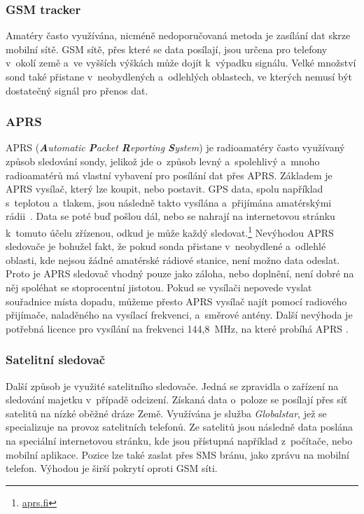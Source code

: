 \documentclass[twoside]{ctuthesis}
\theoremstyle{plain}
\theoremstyle{definition}
\theoremstyle{note}
\begin{document}
				\subsubsection{GSM tracker}
				Amatéry často využívána, nicméně nedoporučovaná metoda \cite{web_sledovani} je zasílání dat skrze mobilní sítě. GSM sítě, přes které se data posílají, jsou určena pro telefony v~okolí země a~ve vyšších výškách může dojít k~výpadku signálu. Velké množství sond také přistane v~neobydlených a~odlehlých oblastech, ve kterých nemusí být dostatečný signál pro přenos dat.


				\subsubsection{APRS}
				APRS (\textit{\textbf{A}utomatic \textbf{P}acket \textbf{R}eporting \textbf{S}ystem}) je radioamatéry často využívaný způsob sledování sondy, jelikož jde o~způsob levný a~spolehlivý a~mnoho radioamatérů má vlastní vybavení pro posílání dat přes APRS. Základem je APRS vysílač, který lze koupit, nebo postavit. GPS data, spolu například s~teplotou a~tlakem, jsou následně takto vysílána a~přijímána amatérskými rádii~\cite{web_sledovani}. Data se poté buď pošlou dál, nebo se nahrají na internetovou stránku k~tomuto účelu zřízenou, odkud je může každý sledovat.\footnote{\url{aprs.fi}}
				Nevýhodou APRS sledovače je bohužel fakt, že pokud sonda přistane v~neobydlené a~odlehlé oblasti, kde nejsou žádné amatérské rádiové stanice, není možno data odeslat. Proto je APRS sledovač vhodný pouze jako záloha, nebo doplnění, není dobré na něj spoléhat se stoprocentní jistotou. Pokud se vysílači nepovede vyslat souřadnice místa dopadu, můžeme přesto APRS vysílač najít pomocí radiového přijímače, naladěného na vysílací frekvenci, a~směrové antény. Další nevýhoda je potřebná licence pro vysílání na frekvenci 144,8~MHz, na které probíhá APRS \cite{web_ctu}.


				\subsubsection{Satelitní sledovač}
				Další způsob je využité satelitního sledovače. Jedná se zpravidla o zařízení na sledování majetku v~případě odcizení. Získaná data o~poloze se posílají přes síť satelitů na nízké oběžné dráze Země. Využívána je služba \textit{Globalstar}, jež se specializuje na provoz satelitních telefonů. Ze satelitů jsou následně data poslána na speciální internetovou stránku, kde jsou přístupná například z~počítače, nebo mobilní aplikace. Pozice lze také zaslat přes SMS bránu, jako zprávu na mobilní telefon. Výhodou je širší pokrytí oproti GSM síti. 
\end{document}
